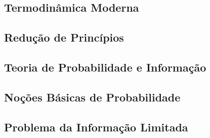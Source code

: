 \documentclass[twoside,reqno]{amsart}
\numberwithin{equation}{section}
\begin{document}

\begin{refsection}
\section{Termodinâmica Moderna}

\subsection{Redução de Princípios}

\printbibliography[heading=subbibliography]
\end{refsection}


\begin{refsection}
\section{Teoria de Probabilidade e Informação}

\subsection{Noções Básicas de Probabilidade}

\subsection{Problema da Informação Limitada}

\printbibliography[heading=subbibliography]
\end{refsection}

\end{document}
